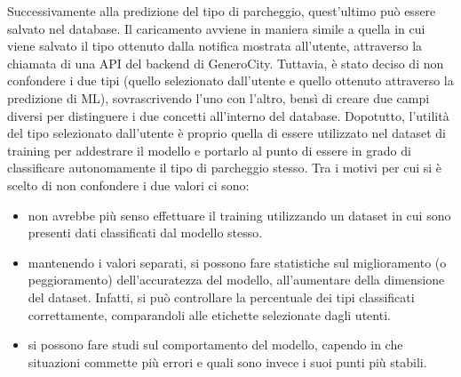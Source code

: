 Successivamente alla predizione del tipo di parcheggio, quest'ultimo può essere salvato
nel database. Il caricamento avviene in maniera simile a quella in cui viene salvato il 
tipo ottenuto dalla notifica mostrata all'utente, attraverso la chiamata di una API del 
backend di GeneroCity. Tuttavia, è stato deciso di non confondere i due tipi (quello
selezionato dall'utente e quello ottenuto attraverso la predizione di ML), sovrascrivendo
l'uno con l'altro, bensì di creare due campi diversi per distinguere i due concetti
all'interno del database. Dopotutto, l'utilità del tipo selezionato dall'utente è proprio
quella di essere utilizzato nel dataset di training per addestrare il modello e portarlo 
al punto di essere in grado di classificare autonomamente il tipo di parcheggio stesso.
Tra i motivi per cui si è scelto di non confondere i due valori ci sono:
\begin{itemize}
    \item non avrebbe più senso effettuare il training utilizzando un dataset in cui sono
    presenti dati classificati dal modello stesso.
    \item mantenendo i valori separati, si possono fare statistiche sul miglioramento
    (o peggioramento) dell'accuratezza del modello, all'aumentare della dimensione del
    dataset. Infatti, si può controllare la percentuale dei tipi classificati correttamente,
    comparandoli alle etichette selezionate dagli utenti.
    \item si possono fare studi sul comportamento del modello, capendo in che situazioni
    commette più errori e quali sono invece i suoi punti più stabili.
\end{itemize}











